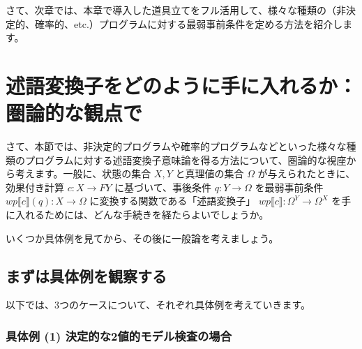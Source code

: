 \documentclass[
		head_space=20mm,
		foot_space=20mm,
		gutter=10mm,
		line_length=190mm
]{jlreq}
\begin{document}

\noindent さて、次章では、本章で導入した道具立てをフル活用して、様々な種類の（非決定的、確率的、etc.）プログラムに対する最弱事前条件を定める方法を紹介します。
\clearpage

\section{述語変換子をどのように手に入れるか：圏論的な観点で}
\label{sec:categorical-weakest-precondition}

さて、本節では、非決定的プログラムや確率的プログラムなどといった様々な種類のプログラムに対する述語変換子意味論を得る方法について、圏論的な視座から考えます。一般に、状態の集合 $X, Y$ と真理値の集合 $\Omega$ が与えられたときに、効果付き計算 $c:X\to FY$ に基づいて、事後条件 $q:Y\to\Omega$ を最弱事前条件 $wp\llbracket c\rrbracket(q):X\to \Omega$ に変換する関数である「述語変換子」 $wp\llbracket c\rrbracket:\Omega^Y\to\Omega^X$ を手に入れるためには、どんな手続きを経たらよいでしょうか。\vspace{8pt}

いくつか具体例を見てから、その後に一般論を考えましょう。\vspace{5pt}

\subsection{まずは具体例を観察する}

以下では、3つのケースについて、それぞれ具体例を考えていきます。

\subsubsection*{具体例 (1)\; 決定的な2値的モデル検査の場合}
\vspace{10pt}
\end{document}
